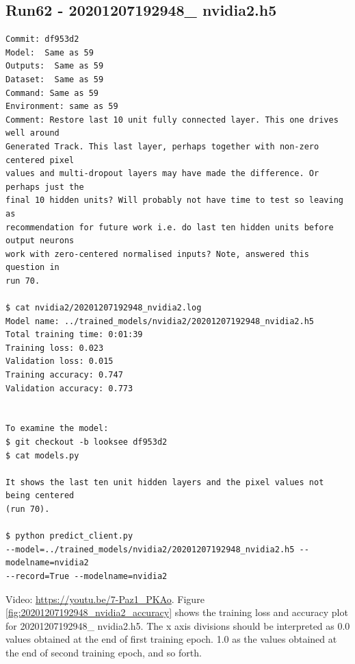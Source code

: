 \subsection{Run62 - 20201207192948\_ nvidia2.h5}
\label{app_res:62}
\begin{verbatim}
Commit: df953d2
Model:  Same as 59
Outputs:  Same as 59
Dataset:  Same as 59
Command: Same as 59
Environment: same as 59
Comment: Restore last 10 unit fully connected layer. This one drives well around 
Generated Track. This last layer, perhaps together with non-zero centered pixel 
values and multi-dropout layers may have made the difference. Or perhaps just the 
final 10 hidden units? Will probably not have time to test so leaving as 
recommendation for future work i.e. do last ten hidden units before output neurons 
work with zero-centered normalised inputs? Note, answered this question in 
run 70.

$ cat nvidia2/20201207192948_nvidia2.log
Model name: ../trained_models/nvidia2/20201207192948_nvidia2.h5
Total training time: 0:01:39
Training loss: 0.023
Validation loss: 0.015
Training accuracy: 0.747
Validation accuracy: 0.773


To examine the model:
$ git checkout -b looksee df953d2
$ cat models.py

It shows the last ten unit hidden layers and the pixel values not being centered
(run 70).

$ python predict_client.py 
--model=../trained_models/nvidia2/20201207192948_nvidia2.h5 --modelname=nvidia2 
--record=True --modelname=nvidia2
\end{verbatim}
Video: \url{https://youtu.be/7-Paz1_PKAo}. Figure \ref{fig:20201207192948_nvidia2_accuracy} 
shows the training loss and accuracy plot for 20201207192948\_ nvidia2.h5.
The x axis divisions should be interpreted as 0.0 values obtained at the end of first training epoch.
1.0 as the values obtained at the end of second training epoch, and so forth.

